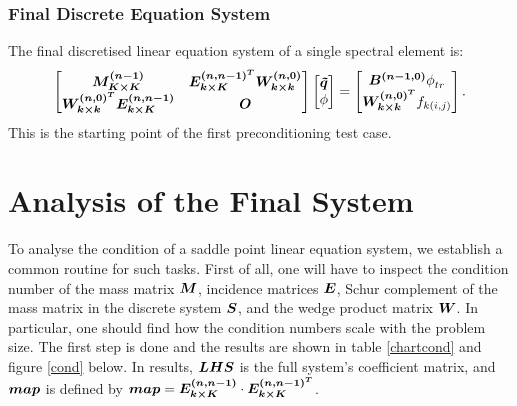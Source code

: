 \subsubsection{Final Discrete Equation System}
The final discretised linear equation system of a single spectral element is: 
\begin{equation}
	\begin{bmatrix}
		\boldsymbol{M^{(n-1)}_{K\times K}} &  \boldsymbol{E^{(n,n-1)^T}_{k\times K}} \boldsymbol{W^{(n,0)}_{k\times k}}\\
		\boldsymbol{W^{(n,0)^T}_{k\times k}}\boldsymbol{E_{k\times K}^{(n,n-1)}} & \boldsymbol{O} 
	\end{bmatrix}
	\begin{bmatrix}
		\boldsymbol{\tilde{q}}\\ \phi
	\end{bmatrix}
	=
	\begin{bmatrix}
		\boldsymbol{B^{(n-1,0)}}\phi^{}_{tr}\\
		\boldsymbol{W^{(n,0)^T}_{k\times k}}{f}_{k(i,j)}
	\end{bmatrix}.
\end{equation}
This is the starting point of the first preconditioning test case. \\

\section{Analysis of the Final System}
To analyse the condition of a saddle point linear equation system, we establish a common routine for such tasks. First of all, one will have to inspect the condition number of the mass matrix $\boldsymbol{M}$, incidence matrices $\boldsymbol{E}$, Schur complement of the mass matrix in the discrete system $\boldsymbol{S}$, and the wedge product matrix $\boldsymbol{W}$. In particular, one should find how the condition numbers scale with the problem size. The first step is done and the results are shown in table \ref{chartcond} and figure \ref{cond} below. In results, $\boldsymbol{LHS}$ is the full system's coefficient matrix, and $\boldsymbol{map}$ is defined by $\boldsymbol{map} = \boldsymbol{E_{k\times K}^{(n,n-1)}}\cdot \boldsymbol{E_{k\times K}^{(n,n-1)^T}}$. \\

